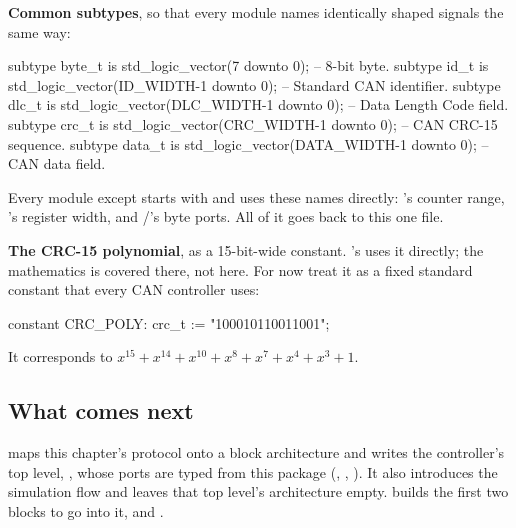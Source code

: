 \textbf{Common subtypes}, so that every module names identically shaped signals the same way:

\begin{vhdlcode}
subtype byte_t is std_logic_vector(7 downto 0);            -- 8-bit byte.
subtype id_t   is std_logic_vector(ID_WIDTH-1 downto 0);   -- Standard CAN identifier.
subtype dlc_t  is std_logic_vector(DLC_WIDTH-1 downto 0);  -- Data Length Code field.
subtype crc_t  is std_logic_vector(CRC_WIDTH-1 downto 0);  -- CAN CRC-15 sequence.
subtype data_t is std_logic_vector(DATA_WIDTH-1 downto 0); -- CAN data field.
\end{vhdlcode}

Every module except  starts with  and uses these names
directly: 's counter range, 's register width, and
/'s byte ports. All of it goes back to this one file.

\textbf{The CRC-15 polynomial}, as a 15-bit-wide constant. 's  uses it
directly; the mathematics is covered there, not here. For now treat it as a fixed standard constant
that every CAN controller uses:

\begin{vhdlcode}
constant CRC_POLY: crc_t := "100010110011001";
\end{vhdlcode}

It corresponds to $x^{15} + x^{14} + x^{10} + x^{8} + x^{7} + x^{4} + x^{3} + 1$.

\subsection*{What comes next}
 maps this chapter's protocol onto a block architecture and writes the controller's
top level, , whose ports are typed from this package (,
, ). It also introduces the simulation flow and leaves that top level's
architecture empty.  builds the first two blocks to go into it,
 and .

